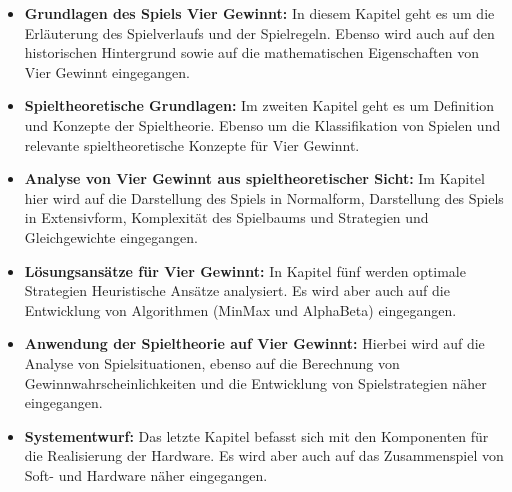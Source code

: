 \begin{itemize}
	\item \textbf{Grundlagen des Spiels Vier Gewinnt:} In diesem Kapitel geht es um die Erläuterung des Spielverlaufs und der Spielregeln. Ebenso wird auch auf den historischen Hintergrund sowie auf die mathematischen Eigenschaften von Vier Gewinnt eingegangen.

\item \textbf{Spieltheoretische Grundlagen:} Im zweiten Kapitel geht es um Definition und Konzepte der Spieltheorie. Ebenso um die Klassifikation von Spielen und relevante spieltheoretische Konzepte für Vier Gewinnt.

\item \textbf{Analyse von Vier Gewinnt aus spieltheoretischer Sicht:} Im Kapitel hier wird auf die Darstellung des Spiels in Normalform, Darstellung des Spiels in Extensivform, Komplexität des Spielbaums und Strategien und Gleichgewichte eingegangen.

\item \textbf{Lösungsansätze für Vier Gewinnt:} In Kapitel fünf werden optimale Strategien
Heuristische Ansätze analysiert. Es wird aber auch auf die Entwicklung von Algorithmen (MinMax und AlphaBeta) eingegangen.

\item \textbf{Anwendung der Spieltheorie auf Vier Gewinnt:} Hierbei wird auf die Analyse von Spielsituationen, ebenso auf die Berechnung von Gewinnwahrscheinlichkeiten und die Entwicklung von Spielstrategien näher eingegangen. 

\item \textbf{Systementwurf:} Das letzte Kapitel befasst sich mit den Komponenten für die Realisierung der Hardware. Es wird aber auch auf das Zusammenspiel von Soft- und Hardware näher eingegangen.
\end{itemize}





